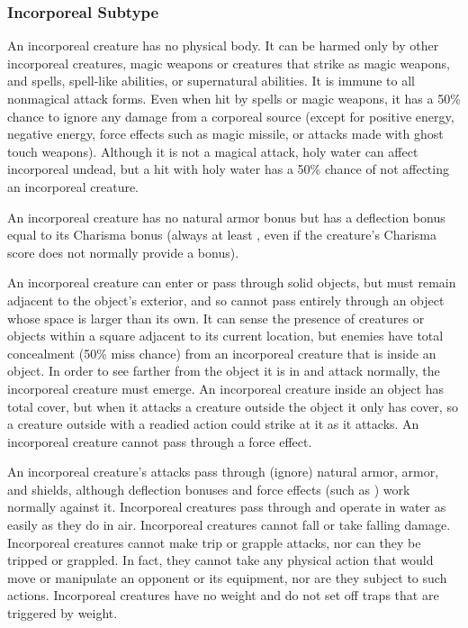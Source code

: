 \subsubsection{Incorporeal Subtype} An incorporeal creature has no physical body. It can be harmed only by other incorporeal creatures, magic weapons or creatures that strike as magic weapons, and spells, spell-like abilities, or supernatural abilities. It is immune to all nonmagical attack forms. Even when hit by spells or magic weapons, it has a 50\% chance to ignore any damage from a corporeal source (except for positive energy, negative energy, force effects such as magic missile, or attacks made with ghost touch weapons). Although it is not a magical attack, holy water can affect incorporeal undead, but a hit with holy water has a 50\% chance of not affecting an incorporeal creature.

\par An incorporeal creature has no natural armor bonus but has a deflection bonus equal to its Charisma bonus (always at least , even if the creature's Charisma score does not normally provide a bonus). 

\par An incorporeal creature can enter or pass through solid objects, but must remain adjacent to the object's exterior, and so cannot pass entirely through an object whose space is larger than its own. It can sense the presence of creatures or objects within a square adjacent to its current location, but enemies have total concealment (50\% miss chance) from an incorporeal creature that is inside an object. In order to see farther from the object it is in and attack normally, the incorporeal creature must emerge. An incorporeal creature inside an object has total cover, but when it attacks a creature outside the object it only has cover, so a creature outside with a readied action could strike at it as it attacks. An incorporeal creature cannot pass through a force effect.

\par An incorporeal creature's attacks pass through (ignore) natural armor, armor, and shields, although deflection bonuses and force effects (such as ) work normally against it. Incorporeal creatures pass through and operate in water as easily as they do in air. Incorporeal creatures cannot fall or take falling damage. Incorporeal creatures cannot make trip or grapple attacks, nor can they be tripped or grappled. In fact, they cannot take any physical action that would move or manipulate an opponent or its equipment, nor are they subject to such actions. Incorporeal creatures have no weight and do not set off traps that are triggered by weight.

